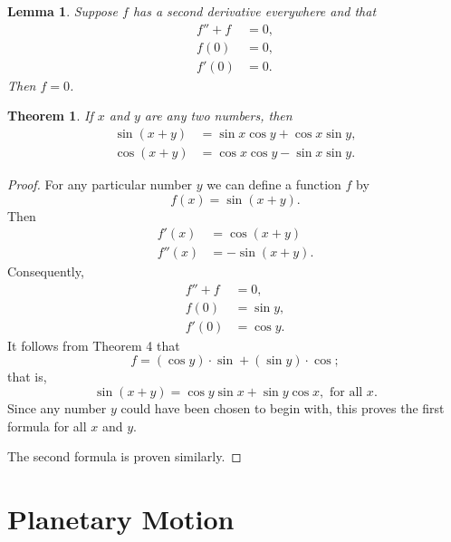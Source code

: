 \documentclass{article}
\numberwithin{corollary}{subsection}
\numberwithin{definition}{subsection}
\numberwithin{lemma}{subsection}
\newtheorem*{lemma*}{Lemma}
\newtheorem{theorem}{Theorem}
\numberwithin{theorem}{subsection}
\begin{document}
\begin{lemma*}
  Suppose $f$ has a second derivative everywhere and that
  \begin{align*}
    f'' + f &= 0, \\
    f(0) &= 0, \\
    f'(0) &= 0.
  \end{align*}
  Then $f = 0$.
\end{lemma*}

\begin{theorem}
  If $x$ and $y$ are any two numbers, then \begin{align*}
    \sin(x + y) &= \sin x \cos y + \cos x \sin y, \\
    \cos(x + y) &= \cos x \cos y - \sin x \sin y.
  \end{align*}
\end{theorem}

\begin{proof}
  For any particular number $y$ we can define a function $f$ by \[
    f(x) = \sin(x + y).
  \] Then
  \begin{align*}
    f'(x) &= \cos(x + y) \\
    f''(x) &= -\sin(x + y).
  \end{align*}
  Consequently,
  \begin{align*}
    f'' + f &= 0, \\
    f(0)    &= \sin y, \\
    f'(0)   &= \cos y.
  \end{align*}
  It follows from Theorem 4 that \[
    f = (\cos y ) \cdot \sin{} + (\sin y) \cdot \cos{};
  \] that is, \[
    \sin(x + y) = \cos y \sin x + \sin y \cos x, \text{ for all } x.
  \] Since any number $y$ could have been chosen to begin with, this proves the
  first formula for all $x$ and $y$.

  The second formula is proven similarly.
\end{proof}

\section{Planetary Motion}
\end{document}
